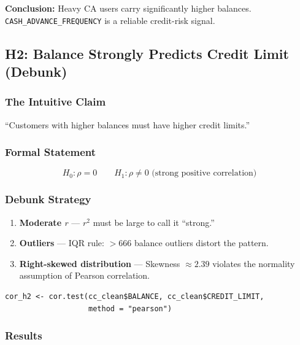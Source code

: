 \documentclass[12pt, letterpaper]{article}
\begin{document}
\textbf{Conclusion:} Heavy CA users carry significantly higher balances.
\texttt{CASH\_ADVANCE\_FREQUENCY} is a reliable credit-risk signal.

\subsection{H2: Balance Strongly Predicts Credit Limit (Debunk)}

\subsubsection{The Intuitive Claim}

``Customers with higher balances must have higher credit limits.''

\subsubsection{Formal Statement}

\[
  H_0: \rho = 0
  \qquad
  H_1: \rho \neq 0 \text{ (strong positive correlation)}
\]

\subsubsection{Debunk Strategy}

\begin{enumerate}
  \item \textbf{Moderate $r$} --- $r^2$ must be large to call it ``strong.''
  \item \textbf{Outliers} --- IQR rule: $>$666 balance outliers distort the pattern.
  \item \textbf{Right-skewed distribution} --- Skewness $\approx 2.39$ violates
    the normality assumption of Pearson correlation.
\end{enumerate}

\begin{lstlisting}[caption={H2 Test}]
cor_h2 <- cor.test(cc_clean$BALANCE, cc_clean$CREDIT_LIMIT,
                   method = "pearson")
\end{lstlisting}

\subsubsection{Results}
\end{document}
